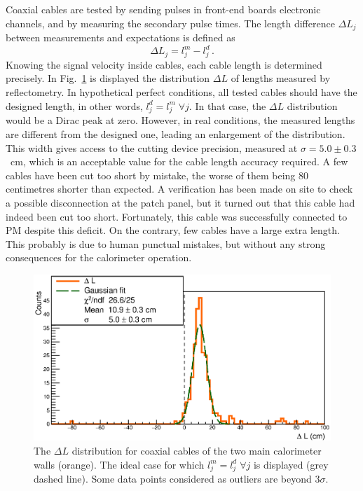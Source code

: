 Coaxial cables are tested by sending pulses in front-end boards electronic channels, and by measuring the secondary pulse times.
The length difference $\Delta L_{j}$ between measurements and expectations is defined as
\begin{equation}
  \Delta L_{j} = l^{m}_{j}-l^{d}_{j}\,.
\end{equation}
Knowing the signal velocity inside cables, each cable length is determined precisely.
In Fig.~\ref{fig:LengthDiff} is displayed the distribution $\Delta L$ of lengths measured by reflectometry.
In hypothetical perfect conditions, all tested cables should have the designed length, in other words, $l^{d}_{j} = l^{m}_{j} \;\forall j$.
In that case, the $\Delta L$ distribution would be a Dirac peak at zero.
However, in real conditions, the measured lengths are different from the designed one, leading an enlargement of the distribution.
This width gives access to the cutting device precision, measured at $\sigma=5.0\pm0.3$~cm, which is an acceptable value for the cable length accuracy required.
A few cables have been cut too short by mistake, the worse of them being $80$ centimetres shorter than expected.
A verification has been made on site to check a possible disconnection at the patch panel, but it turned out that this cable had indeed been cut too short.
Fortunately, this cable  was successfully connected to PM despite this deficit.
On the contrary, few cables have a large extra length.
This probably is due to human punctual mistakes, but without any strong consequences for the calorimeter operation.
\begin{figure}[h!]
  \centering
  \includegraphics[width=15cm]{commissioning/fig_commissioning/length_diff.eps}
  \caption{The $\Delta L$ distribution for coaxial cables of the two main calorimeter walls (orange).
    The ideal case for which $l^{m}_{j} = l^{d}_{j} \;\forall j$ is displayed (grey dashed line).
    Some data points considered as outliers are beyond $3\sigma$.
    \label{fig:LengthDiff}}
\end{figure}

